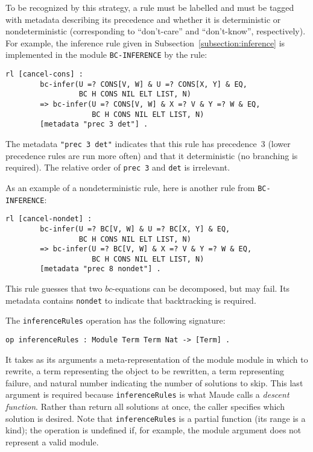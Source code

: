 \documentclass[11pt]{article}
\newcommand{\Bc}{\mathit{bc}}
\begin{document}
To be recognized by this strategy, a rule must be labelled and must be tagged
with metadata describing its precedence and whether it is deterministic or
nondeterministic (corresponding to ``don't-care'' and ``don't-know'',
respectively).  For example, the inference rule given in
Subsection~\ref{subsection:inference} is implemented in the module
\lstinline|BC-INFERENCE| by the rule:
\begin{lstlisting}[language=Maude, style=smalllisting]
    rl [cancel-cons] :
        bc-infer(U =? CONS[V, W] & U =? CONS[X, Y] & EQ,
                 BC H CONS NIL ELT LIST, N)
        => bc-infer(U =? CONS[V, W] & X =? V & Y =? W & EQ,
                    BC H CONS NIL ELT LIST, N)
        [metadata "prec 3 det"] .
\end{lstlisting}
The metadata \lstinline|"prec 3 det"| indicates that this rule has precedence~3
(lower precedence rules are run more often) and that it deterministic (no
branching is required). The relative order of \lstinline|prec 3| and
\lstinline|det| is irrelevant.

As an example of a nondeterministic rule, here is another rule from
\lstinline|BC-INFERENCE|:
\begin{lstlisting}[language=Maude, style=smalllisting]
    rl [cancel-nondet] :
        bc-infer(U =? BC[V, W] & U =? BC[X, Y] & EQ,
                 BC H CONS NIL ELT LIST, N)
        => bc-infer(U =? BC[V, W] & X =? V & Y =? W & EQ,
                    BC H CONS NIL ELT LIST, N)
        [metadata "prec 8 nondet"] .
\end{lstlisting}
This rule guesses that two $\Bc$-equations can be decomposed, but may fail. Its
metadata contains \lstinline|nondet| to indicate that backtracking is required.

The \lstinline|inferenceRules| operation has the following signature:
\begin{lstlisting}[language=Maude, style=smalllisting]
    op inferenceRules : Module Term Term Nat -> [Term] .
\end{lstlisting}
It takes as its arguments a meta-representation of the module module in which
to rewrite, a term representing the object to be rewritten, a term representing
failure, and natural number indicating the number of solutions to skip. This
last argument is required because \lstinline|inferenceRules| is what Maude
calls a \emph{descent function}. Rather than return all solutions at once, the caller
specifies which solution is desired. Note that \lstinline|inferenceRules| is a
partial function (its range is a kind); the operation is undefined if, for
example, the module argument does not represent a valid module.
\end{document}
